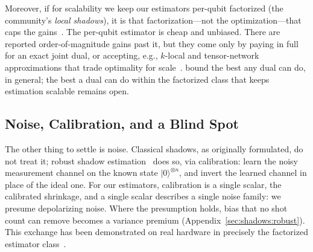 \documentclass[11pt, oneside, openany]{scrbook}
\newcommand{\ket}[1]{|#1\rangle}
\begin{document}
Moreover, if for scalability we keep our estimators per-qubit factorized (the community's \textit{local shadows}), it is that factorization---not the optimization---that caps the gains~\cite{melegari2026exploitingovercompletenessplatonicsolid}. The per-qubit estimator is cheap and unbiased. There are reported order-of-magnitude gains past it, but they come only by paying in full for an exact joint dual, or accepting, e.g., $k$-local and tensor-network approximations that trade optimality for scale~\cite{korhonen2025improvingshadowestimation,mangini2025lowvarianceestimationsa}. \textcite{caprotti2026postprocessingoptimizationoptimal} bound the best any dual can do, in general; the best a dual can do within the factorized class that keeps estimation scalable remains open.

\subsection{Noise, Calibration, and a Blind Spot} \label{sec:povmsinuse:noise}

The other thing to settle is noise. Classical shadows, as originally formulated, do not treat it; robust shadow estimation~\cite{chen2021robustshadowestimationa} does so, via calibration: learn the noisy measurement channel on the known state $\ket{0}^{\otimes n}$, and invert the learned channel in place of the ideal one. For our estimators, calibration is a single scalar, the calibrated shrinkage, and a single scalar describes a single noise family: we presume depolarizing noise. Where the presumption holds, bias that no shot count can remove becomes a variance premium (Appendix~\ref{sec:shadows:robust}). This exchange has been demonstrated on real hardware in precisely the factorized estimator class~\cite{wilkens2026localrobustshadowsa}. %
\end{document}
